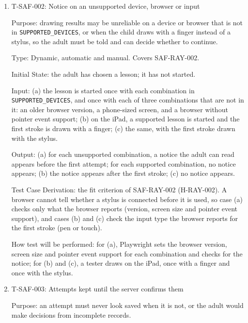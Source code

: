 \documentclass[12pt, titlepage]{article}
\newcommand{\testitem}[1]{\item #1\par\nopagebreak}
\begin{document}
\begin{enumerate}
Test Case Derivation: SAF-RAY-001 and its hazards H-RAY-001 and H-RAY-006.
Random taps imitate a child who cannot read exploring the screen.

How test will be performed: a Playwright script performs the taps, web
addresses and navigation and checks the lesson state after each one; a
tester repeats the taps by hand with the stylus on the iPad.

\testitem{T-SAF-002: Notice on an unsupported device, browser or input}

Purpose: drawing results may be unreliable on a device or browser that is not
in \texttt{SUPPORTED\_DEVICES}, or when the child draws with a finger instead
of a stylus, so the adult must be told and can decide whether to continue.

Type: Dynamic, automatic and manual. Covers SAF-RAY-002.

Initial State: the adult has chosen a lesson; it has not started.

Input: (a) the lesson is started once with each combination in
\texttt{SUPPORTED\_DEVICES}, and once with each of three combinations that
are not in it: an older browser version, a phone-sized screen, and a browser
without pointer event support; (b) on the iPad, a supported lesson is
started and the first stroke is drawn with a finger; (c) the same, with the
first stroke drawn with the stylus.

Output: (a) for each unsupported combination, a notice the adult can read
appears before the first attempt; for each supported combination, no notice
appears; (b) the notice appears after the first stroke; (c) no notice
appears.

Test Case Derivation: the fit criterion of SAF-RAY-002 (H-RAY-002). A
browser cannot tell whether a stylus is connected before it is used, so
case (a) checks only what the browser reports (version, screen size and
pointer event support), and cases (b) and (c) check the input type the
browser reports for the first stroke (pen or touch).

How test will be performed: for (a), Playwright sets the browser version,
screen size and pointer event support for each combination and checks for
the notice; for (b) and (c), a tester draws on the iPad, once with a finger
and once with the stylus.

\testitem{T-SAF-003: Attempts kept until the server confirms them}

Purpose: an attempt must never look saved when it is not, or the adult would
make decisions from incomplete records.


\end{enumerate}
\end{document}
